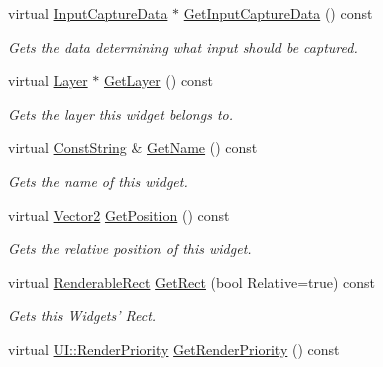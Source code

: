 \begin{DoxyCompactItemize}
virtual \hyperlink{classMezzanine_1_1UI_1_1InputCaptureData}{InputCaptureData} $\ast$ \hyperlink{classMezzanine_1_1UI_1_1Widget_a7aa4803d32b18d8f5d9550942b2acfe2}{GetInputCaptureData} () const 
\begin{DoxyCompactList}\small\item\em Gets the data determining what input should be captured. \item\end{DoxyCompactList}\item 
virtual \hyperlink{classMezzanine_1_1UI_1_1Layer}{Layer} $\ast$ \hyperlink{classMezzanine_1_1UI_1_1Widget_a33ff8bd7663738501c9ee895e08a236b}{GetLayer} () const 
\begin{DoxyCompactList}\small\item\em Gets the layer this widget belongs to. \item\end{DoxyCompactList}\item 
virtual \hyperlink{namespaceMezzanine_a63cd699ac54b73953f35ec9cfc05e506}{ConstString} \& \hyperlink{classMezzanine_1_1UI_1_1Widget_abcd2c0e80a7766524eeb63f6972baff7}{GetName} () const 
\begin{DoxyCompactList}\small\item\em Gets the name of this widget. \item\end{DoxyCompactList}\item 
virtual \hyperlink{classMezzanine_1_1Vector2}{Vector2} \hyperlink{classMezzanine_1_1UI_1_1Widget_ab498fab9f2b18236a301faa0aed9cb0d}{GetPosition} () const 
\begin{DoxyCompactList}\small\item\em Gets the relative position of this widget. \item\end{DoxyCompactList}\item 
virtual \hyperlink{structMezzanine_1_1UI_1_1RenderableRect}{RenderableRect} \hyperlink{classMezzanine_1_1UI_1_1Widget_a4a3de058cf3a274be9e8e1fb765da7e6}{GetRect} (bool Relative=true) const 
\begin{DoxyCompactList}\small\item\em Gets this Widgets' Rect. \item\end{DoxyCompactList}\item 
virtual \hyperlink{namespaceMezzanine_1_1UI_ac4c753eb6b5d66350a243acc9ce54130}{UI::RenderPriority} \hyperlink{classMezzanine_1_1UI_1_1Widget_a8c446ca630751e31cc2b6e6dda8fa918}{GetRenderPriority} () const 

\end{DoxyCompactItemize}
